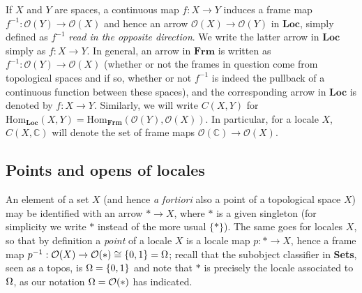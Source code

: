 \documentclass[12pt]{article}
\newcommand{\Sets}{\mbox{\textbf{Sets}}}
\newcommand{\raw}{\rightarrow} \newcommand{\rat}{\mapsto}
\newcommand{\inv}{^{-1}}
\newcommand{\CO}{{\mathcal O}} \newcommand{\CP}{{\mathcal P}}
\newcommand{\C}{{\mathbb C}} \newcommand{\D}{{\mathbb D}}
\begin{document}
If $X$ and $Y$ are spaces, a continuous
map $f:X\raw Y$ induces a frame map $f\inv:  \CO(Y)\raw \CO(X)$ and hence an arrow
$\CO(X)\raw \CO(Y)$ in $\mathbf{Loc}$, simply defined as
$f\inv$ {\it read in the opposite direction}. We write the latter arrow in $\mathbf{Loc}$
simply as $f:X\raw Y$. In general, an arrow in $\mathbf{Frm}$ is written
as $f\inv:  \CO(Y)\raw \CO(X)$ (whether or not the frames in question come from topological spaces and if so, whether or not $f\inv$ is indeed the pullback of a continuous function between these spaces), and the corresponding arrow in $\mathbf{Loc}$ is denoted by $f:X\raw Y$.
 Similarly,  we will write $C(X,Y)$
 for $\mathrm{Hom}_{\mathbf{Loc}}(X,Y)=\mathrm{Hom}_{\mathbf{Frm}}(\CO(Y),\CO(X))$.
 In particular, for a locale $X$, $C(X,\C)$
 will denote the set of frame maps $\CO(\C)\raw \CO(X)$.
 \subsection{Points and opens of locales}\label{subsection:locale2}
An element of a set $X$ (and hence {\it a fortiori} also a point of a topological space $X$)
may be identified with an arrow $*\raw X$, where $*$ is a given singleton (for simplicity we write $*$ instead of the more usual $\{*\}$). The same goes for locales $X$, so that by definition a {\it point} of a locale $X$ is  a locale map  $p:*\raw X$, hence a frame map
$p\inv: \CO(X)\raw\CO(*)\cong\{0,1\}=\Om$; recall that the subobject classifier in \Sets, seen as a topos, is $\Omega=\{0,1\}$ and note that $*$ is precisely the locale associated to $\Omega$, as our notation $\Om=\CO(*)$ has indicated.
\end{document}
